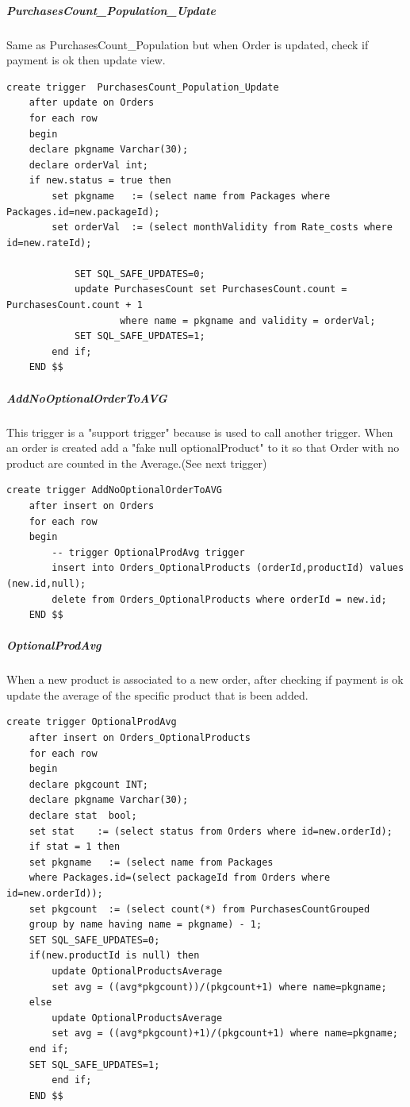\documentclass{article}
\begin{document}
\subparagraph{PurchasesCount_Population_Update}
Same as PurchasesCount_Population but when Order is updated, check if payment is ok then update view.
\begin{lstlisting}
create trigger  PurchasesCount_Population_Update
    after update on Orders
    for each row
	begin
	declare pkgname Varchar(30);
    declare orderVal int;
    if new.status = true then
		set pkgname   := (select name from Packages where Packages.id=new.packageId);
		set orderVal  := (select monthValidity from Rate_costs where id=new.rateId);

            SET SQL_SAFE_UPDATES=0;
			update PurchasesCount set PurchasesCount.count = PurchasesCount.count + 1
					where name = pkgname and validity = orderVal;
            SET SQL_SAFE_UPDATES=1;
        end if;
    END $$
\end{lstlisting}

\subparagraph{AddNoOptionalOrderToAVG}
This trigger is a "support trigger" because is used to call another trigger.
When an order is created add a "fake null optionalProduct" to it so that Order with no product are counted in the Average.(See next trigger)
\begin{lstlisting}
create trigger AddNoOptionalOrderToAVG
	after insert on Orders
    for each row
    begin
		-- trigger OptionalProdAvg trigger
		insert into Orders_OptionalProducts (orderId,productId) values (new.id,null);
		delete from Orders_OptionalProducts where orderId = new.id;
    END $$
\end{lstlisting}

\subparagraph{OptionalProdAvg}
When a new product is associated to a new order, after checking if payment is ok update the average of the specific product that is been added.
\begin{lstlisting}
create trigger OptionalProdAvg
	after insert on Orders_OptionalProducts
	for each row
    begin
    declare pkgcount INT;
    declare pkgname Varchar(30);
    declare stat  bool;
    set stat    := (select status from Orders where id=new.orderId);
    if stat = 1 then
    set pkgname   := (select name from Packages 
    where Packages.id=(select packageId from Orders where id=new.orderId));
	set pkgcount  := (select count(*) from PurchasesCountGrouped 
	group by name having name = pkgname) - 1;
	SET SQL_SAFE_UPDATES=0;
    if(new.productId is null) then
		update OptionalProductsAverage 
		set avg = ((avg*pkgcount))/(pkgcount+1) where name=pkgname;
    else 
		update OptionalProductsAverage 
		set avg = ((avg*pkgcount)+1)/(pkgcount+1) where name=pkgname;
    end if;
    SET SQL_SAFE_UPDATES=1;
        end if;
    END $$
\end{lstlisting}
\end{document}
